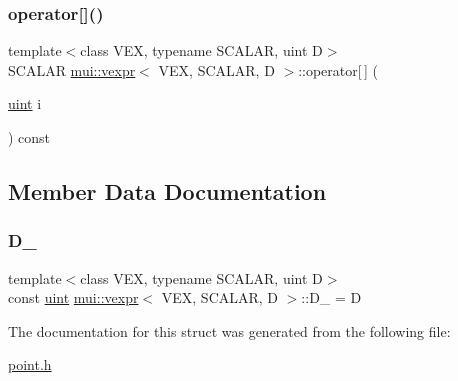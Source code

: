 \mbox{\label{structmui_1_1vexpr_a4e1b8b2db02353296dd5d96dfa3e12e7}} 
\subsubsection{\texorpdfstring{operator[]()}{operator[]()}}
{\footnotesize\ttfamily template$<$class V\+EX, typename S\+C\+A\+L\+AR, uint D$>$ \\
S\+C\+A\+L\+AR \hyperlink{structmui_1_1vexpr}{mui\+::vexpr}$<$ V\+EX, S\+C\+A\+L\+AR, D $>$\+::operator\mbox{[}$\,$\mbox{]} (\begin{DoxyParamCaption}\item[{\hyperlink{namespacemui_af15a3e7188a2117fb9965277bb0cacd2}{uint}}]{i }\end{DoxyParamCaption}) const\hspace{0.3cm}{\ttfamily [inline]}}



\subsection{Member Data Documentation}
\mbox{\label{structmui_1_1vexpr_ad1071e69bd16f8c886f8b92473227215}} 
\subsubsection{\texorpdfstring{D\+\_\+}{D\_}}
{\footnotesize\ttfamily template$<$class V\+EX, typename S\+C\+A\+L\+AR, uint D$>$ \\
const \hyperlink{namespacemui_af15a3e7188a2117fb9965277bb0cacd2}{uint} \hyperlink{structmui_1_1vexpr}{mui\+::vexpr}$<$ V\+EX, S\+C\+A\+L\+AR, D $>$\+::D\+\_\+ = D\hspace{0.3cm}{\ttfamily [static]}}



The documentation for this struct was generated from the following file\+:\begin{DoxyCompactItemize}
\item 
\hyperlink{point_8h}{point.\+h}\end{DoxyCompactItemize}

